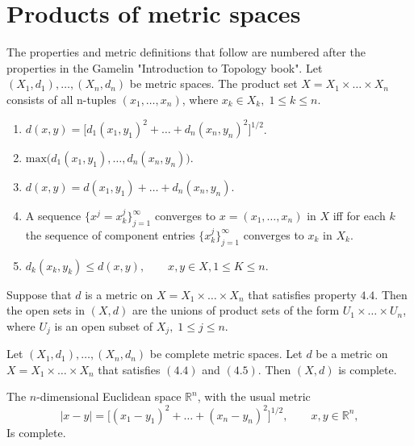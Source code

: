 \documentclass[nobib,notoc]{tufte-handout}
\begin{document}
\section{Products of metric spaces}
	The properties and metric definitions that follow are numbered after the properties in the Gamelin "Introduction to Topology book". Let \((X_1,d_1),\ldots,(X_n,d_n)\) be metric spaces. The product set \(X=X_1\times\ldots\times X_n\) consists of all n-tuples \((x_1,\ldots,x_n)\), where \(x_k\in X_k,\; 1\leq k\leq n\).
\begin{enumerate}[label=(4.\arabic*)]
	\item \(d(x,y)=\big[d_1(x_1,y_1)^2+\ldots+d_n(x_n,y_n)^2\big]^{1/2}\).
	\item \(\text{max}\big(d_1(x_1,y_1),\ldots,d_n(x_n,y_n)\big)\).
	\item \(d(x,y)=d(x_1,y_1)+\ldots+d_n(x_n,y_n)\).
	\item A sequence \(\{x^{j}=x_k^j\}_{j=1}^{\infty}\) converges to \(x=(x_1,\ldots,x_n)\) in \(X\) iff for each \(k\) the sequence of component entries \(\{x_k^j\}_{j=1}^{\infty}\) converges to \(x_k\) in \(X_k\).
	\item \(d_k(x_k,y_k)\leq d(x,y),\qquad x,y\in X, 1\leq K\leq n\).
\end{enumerate}
\begin{thm}
	Suppose that \(d\) is a metric on \(X=X_1\times\ldots\times X_n\) that satisfies property \(4.4\). Then the open sets in \((X,d)\) are the unions of product sets of the form \(U_1\times\ldots\times U_n\), where \(U_j\) is an open subset of \(X_j,\;1\leq j\leq n\).
\end{thm}
\begin{thm}
	Let \((X_1,d_1),\ldots,(X_n,d_n)\) be complete metric spaces. Let \(d\) be a metric on \(X=X_1\times\ldots\times X_n\) that satisfies \((4.4)\) and \((4.5)\). Then \((X,d)\) is complete.
\end{thm}
\begin{cor}
	The \(n\)-dimensional Euclidean space \(\mathbb{R}^n\), with the usual metric
	\begin{equation*}
		\lvert x-y\rvert=\big[(x_1-y_1)^2+\ldots+(x_n-y_n)^2\big]^{1/2},\qquad x,y\in\mathbb{R}^n,
	\end{equation*}
	Is complete.
\end{cor}
\end{document}

